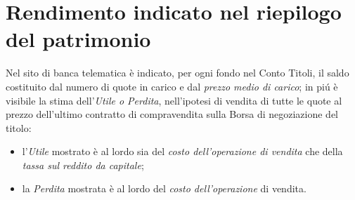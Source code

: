 \documentclass[12pt,a4paper]{article}
\begin{document}
\section{Rendimento indicato nel riepilogo del patrimonio}


Nel sito di  banca telematica è indicato, per  ogni fondo nel Conto Titoli, il  saldo costituito dal
numero  di quote  in  carico e  dal  \emph{prezzo  medio di  carico};  in piú  è  visibile la  stima
dell'\emph{Utile  o Perdita},  nell'ipotesi  di vendita  di  tutte le  quote  al prezzo  dell'ultimo
contratto di compravendita sulla Borsa di negoziazione del titolo:
\begin{itemize}
\item l'\emph{Utile} mostrato è  al lordo sia del \emph{costo dell'operazione  di vendita} che della
  \emph{tassa sul reddito da capitale};
\item la \emph{Perdita} mostrata è al lordo del \emph{costo dell'operazione} di vendita.
\end{itemize}
\end{document}
